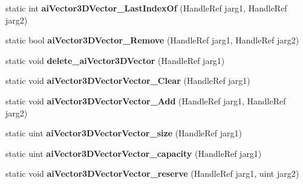 \begin{DoxyCompactItemize}
\item 
\hypertarget{class_assimp_p_i_n_v_o_k_e_a7fb3b4d06b7d8e81f35af31ea7179c89}{static int {\bfseries ai\+Vector3\+D\+Vector\+\_\+\+Last\+Index\+Of} (Handle\+Ref jarg1, Handle\+Ref jarg2)}\label{class_assimp_p_i_n_v_o_k_e_a7fb3b4d06b7d8e81f35af31ea7179c89}

\item 
\hypertarget{class_assimp_p_i_n_v_o_k_e_ac9950186a0642b1044b24f332d3a5f19}{static bool {\bfseries ai\+Vector3\+D\+Vector\+\_\+\+Remove} (Handle\+Ref jarg1, Handle\+Ref jarg2)}\label{class_assimp_p_i_n_v_o_k_e_ac9950186a0642b1044b24f332d3a5f19}

\item 
\hypertarget{class_assimp_p_i_n_v_o_k_e_ad845954ca161c3a7725b7f93e0ac6452}{static void {\bfseries delete\+\_\+ai\+Vector3\+D\+Vector} (Handle\+Ref jarg1)}\label{class_assimp_p_i_n_v_o_k_e_ad845954ca161c3a7725b7f93e0ac6452}

\item 
\hypertarget{class_assimp_p_i_n_v_o_k_e_a2269d34dedc711ea87947cf05979b6cd}{static void {\bfseries ai\+Vector3\+D\+Vector\+Vector\+\_\+\+Clear} (Handle\+Ref jarg1)}\label{class_assimp_p_i_n_v_o_k_e_a2269d34dedc711ea87947cf05979b6cd}

\item 
\hypertarget{class_assimp_p_i_n_v_o_k_e_a95248a55969364d463a28d298bc3f86e}{static void {\bfseries ai\+Vector3\+D\+Vector\+Vector\+\_\+\+Add} (Handle\+Ref jarg1, Handle\+Ref jarg2)}\label{class_assimp_p_i_n_v_o_k_e_a95248a55969364d463a28d298bc3f86e}

\item 
\hypertarget{class_assimp_p_i_n_v_o_k_e_a72180a81547c4a660e8897136d2b721c}{static uint {\bfseries ai\+Vector3\+D\+Vector\+Vector\+\_\+size} (Handle\+Ref jarg1)}\label{class_assimp_p_i_n_v_o_k_e_a72180a81547c4a660e8897136d2b721c}

\item 
\hypertarget{class_assimp_p_i_n_v_o_k_e_a7af2e9ee6dac48a4c68042ec61fed9d1}{static uint {\bfseries ai\+Vector3\+D\+Vector\+Vector\+\_\+capacity} (Handle\+Ref jarg1)}\label{class_assimp_p_i_n_v_o_k_e_a7af2e9ee6dac48a4c68042ec61fed9d1}

\item 
\hypertarget{class_assimp_p_i_n_v_o_k_e_a0b0c6fec329d79147fbd21a72f7ed6d0}{static void {\bfseries ai\+Vector3\+D\+Vector\+Vector\+\_\+reserve} (Handle\+Ref jarg1, uint jarg2)}\label{class_assimp_p_i_n_v_o_k_e_a0b0c6fec329d79147fbd21a72f7ed6d0}


\end{DoxyCompactItemize}
